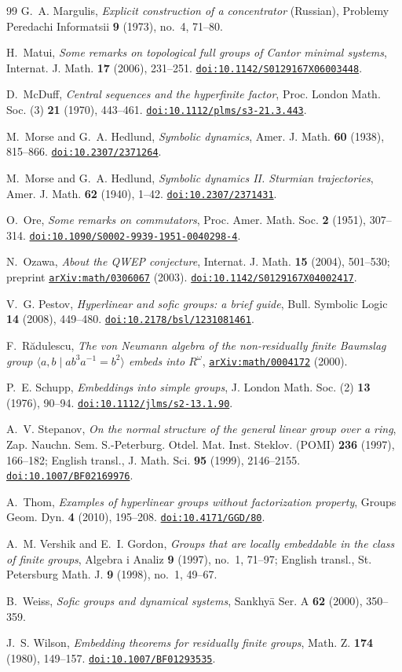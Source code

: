 \documentclass[11pt]{amsart}
\newcommand{\doi}[1]{\href{https://doi.org/#1}{\nolinkurl{doi:#1}}}
\newcommand{\arxiv}[1]{\href{https://arxiv.org/abs/#1}{\nolinkurl{arXiv:#1}}}
\begin{document}
\begin{thebibliography}{99}
G.~A. Margulis, \emph{Explicit construction of a concentrator}
(Russian), Problemy Peredachi Informatsii \textbf{9} (1973), no.~4,
71--80.

H.~Matui, \emph{Some remarks on topological full groups of Cantor
minimal systems}, Internat. J. Math. \textbf{17} (2006), 231--251.
\doi{10.1142/S0129167X06003448}.

D.~McDuff, \emph{Central sequences and the hyperfinite factor},
Proc. London Math. Soc. (3) \textbf{21} (1970), 443--461.
\doi{10.1112/plms/s3-21.3.443}.

M.~Morse and G.~A. Hedlund, \emph{Symbolic dynamics},
Amer. J. Math. \textbf{60} (1938), 815--866.
\doi{10.2307/2371264}.

M.~Morse and G.~A. Hedlund,
\emph{Symbolic dynamics II. Sturmian trajectories},
Amer. J. Math. \textbf{62} (1940), 1--42.
\doi{10.2307/2371431}.

O.~Ore, \emph{Some remarks on commutators},
Proc. Amer. Math. Soc. \textbf{2} (1951), 307--314.
\doi{10.1090/S0002-9939-1951-0040298-4}.

N.~Ozawa, \emph{About the QWEP conjecture},
Internat. J. Math. \textbf{15} (2004), 501--530; preprint \arxiv{math/0306067} (2003).
\doi{10.1142/S0129167X04002417}.

V.~G. Pestov, \emph{Hyperlinear and sofic groups: a brief guide},
Bull. Symbolic Logic \textbf{14} (2008), 449--480.
\doi{10.2178/bsl/1231081461}.

F.~R\u{a}dulescu, \emph{The von Neumann algebra of the non-residually
finite Baumslag group $\langle a,b\mid ab^3a^{-1}=b^2\rangle$ embeds into
$R^\omega$}, \arxiv{math/0004172}
(2000).

P.~E. Schupp, \emph{Embeddings into simple groups},
J. London Math. Soc. (2) \textbf{13} (1976), 90--94.
\doi{10.1112/jlms/s2-13.1.90}.

A.~V. Stepanov, \emph{On the normal structure of the general linear
group over a ring}, Zap. Nauchn. Sem. S.-Peterburg. Otdel. Mat. Inst. Steklov. (POMI) \textbf{236} (1997), 166--182;
English transl., J. Math. Sci. \textbf{95} (1999), 2146--2155.
\doi{10.1007/BF02169976}.

A.~Thom, \emph{Examples of hyperlinear groups without factorization
property}, Groups Geom. Dyn. \textbf{4} (2010), 195--208.
\doi{10.4171/GGD/80}.

A.~M. Vershik and E.~I. Gordon,
\emph{Groups that are locally embeddable in the class of finite groups},
Algebra i Analiz \textbf{9} (1997), no.~1, 71--97; English transl.,
St. Petersburg Math. J. \textbf{9} (1998), no.~1, 49--67.

B.~Weiss, \emph{Sofic groups and dynamical systems}, Sankhy\={a} Ser. A
\textbf{62} (2000), 350--359.

J.~S. Wilson, \emph{Embedding theorems for residually finite groups},
Math. Z. \textbf{174} (1980), 149--157.
\doi{10.1007/BF01293535}.


\end{thebibliography}
\end{document}
